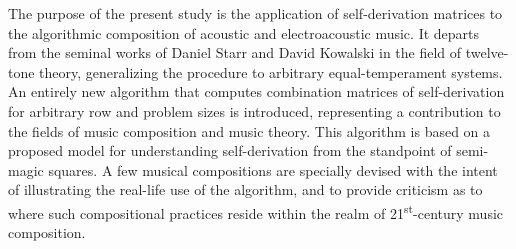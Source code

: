 The purpose of the present study is the application of self-derivation matrices to the algorithmic composition of acoustic and electroacoustic music. It departs from the seminal works of Daniel Starr and David Kowalski in the field of twelve-tone theory, generalizing the procedure to arbitrary equal-temperament systems. An entirely new algorithm that computes combination matrices of self-derivation for arbitrary row and problem sizes is introduced, representing a contribution to the fields of music composition and music theory. This algorithm is based on a proposed model for understanding self-derivation from the standpoint of semi-magic squares. A few musical compositions are specially devised with the intent of illustrating the real-life use of the algorithm, and to provide criticism as to where such compositional practices reside within the realm of 21\textsuperscript{st}-century music composition.